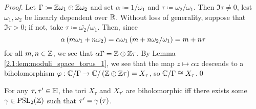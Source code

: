 \documentclass[../Moduli_Spaces_of_Riemann_Surfaces.tex]{subfiles}
\begin{document}
    \begin{proof}
        Let $\Gamma\coloneqq\mathbb{Z}\omega_1\oplus\mathbb{Z}\omega_2$ and set $\alpha\coloneqq1/\omega_1$ and $\tau\coloneqq\omega_2/\omega_1$. Then $\Im\tau\neq0$, lest $\omega_1,\omega_2$ be linearly dependent over $\mathbb{R}$. Without loss of generality, suppose that $\Im\tau>0$; if not, take $\tau\coloneqq\bar{\omega_2}/\omega_1$. Then, since
        \begin{equation*}
            \alpha\left(m\omega_1+n\omega_2\right)=\alpha\omega_1\left(m+n\omega_2/\omega_1\right)=m+n\tau
        \end{equation*}
        for all $m,n\in\mathbb{Z}$, we see that $\alpha\Gamma=\mathbb{Z}\oplus\mathbb{Z}\tau$. By Lemma \ref{2.1:lem:moduli_space_torus_1}, we see that the map $z\mapsto\alpha z$ descends to a biholomorphism $\varphi:\mathbb{C}/\Gamma\to\mathbb{C}/\left(\mathbb{Z}\oplus\mathbb{Z}\tau\right)=X_\tau$, so $\mathbb{C}/\Gamma\cong X_\tau$.\qed
    \end{proof}
    \begin{theorem}
        For any $\tau,\tau'\in\mathbb{H}$, the tori $X_{\tau}$ and $X_{\tau'}$ are biholomorphic iff there exists some $\gamma\in\operatorname{PSL}_{2}\!\left(\mathbb{Z}\right)$ such that $\tau'=\gamma\left(\tau\right)$.
    \end{theorem}
\end{document}
